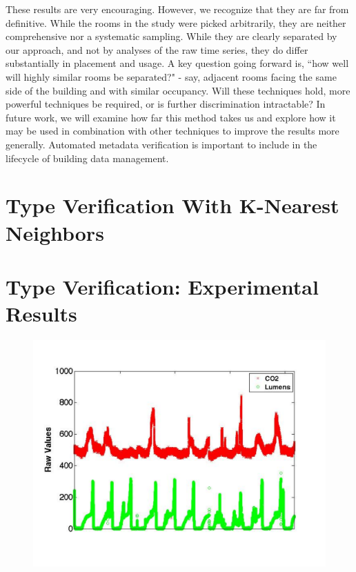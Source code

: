 These results are very encouraging. However, we recognize that they are far from definitive. While the rooms in the study were picked arbitrarily, they are neither comprehensive nor a systematic sampling.  While they are clearly separated by our approach, and not by analyses of the raw time series, they do differ substantially in placement and usage.  A key question going forward is, ``how well will highly similar rooms be separated?"  - say, adjacent rooms facing the same side of the building and with similar occupancy. Will these techniques hold, more powerful techniques be required, or is further discrimination intractable? In future work, we will examine how far this method takes us and explore how it may be used in combination with other techniques to improve the results more generally. Automated metadata verification is important to include in the lifecycle of building data management.

























\section{Type Verification With K-Nearest Neighbors}


\section{Type Verification: Experimental Results}

\begin{figure}[t!] %
\centering
\includegraphics[width=0.75\columnwidth]{figs/KETI413_co2_light_raw}
\caption{}
\label{fig:co2_light_raw}
\end{figure}

